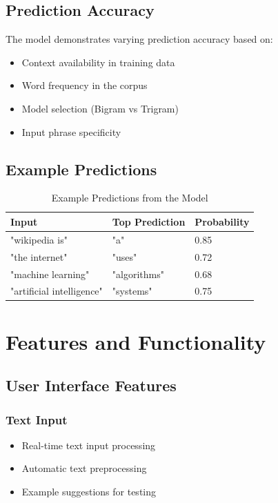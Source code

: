 \documentclass[12pt,a4paper]{report}
\begin{document}
\section{Prediction Accuracy}

The model demonstrates varying prediction accuracy based on:
\begin{itemize}
    \item Context availability in training data
    \item Word frequency in the corpus
    \item Model selection (Bigram vs Trigram)
    \item Input phrase specificity
\end{itemize}

\section{Example Predictions}

\begin{table}[H]
\centering
\begin{tabular}{|p{3cm}|p{3cm}|p{3cm}|}
\hline
\textbf{Input} & \textbf{Top Prediction} & \textbf{Probability} \\
\hline
"wikipedia is" & "a" & 0.85 \\
"the internet" & "uses" & 0.72 \\
"machine learning" & "algorithms" & 0.68 \\
"artificial intelligence" & "systems" & 0.75 \\
\hline
\end{tabular}
\caption{Example Predictions from the Model}
\end{table}

\chapter{Features and Functionality}

\section{User Interface Features}

\subsection{Text Input}
\begin{itemize}
    \item Real-time text input processing
    \item Automatic text preprocessing
    \item Example suggestions for testing
\end{itemize}
\end{document}
